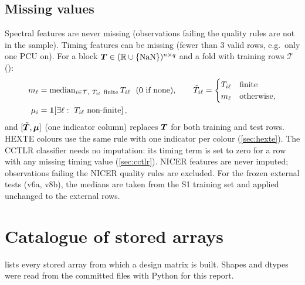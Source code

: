 \subsection{Missing values}\label{sec:missing}
Spectral features are never missing (observations failing the quality rules are not in the sample). Timing features can
be missing (fewer than 3 valid rows, e.g.\ only one PCU on). For a block $\bm{T}\in(\mathbb{R}\cup\{\mathrm{NaN}\})^{n\times q}$
and a fold with training rows $\mathcal T$ ():
\begin{equation}
\begin{split}
m_\ell &= \operatorname{median}_{i\in\mathcal T,\ T_{i\ell}\ \mathrm{finite}} T_{i\ell}\ \ (0\ \text{if none}),\qquad
\tilde T_{i\ell} = \begin{cases}T_{i\ell} & \text{finite}\\ m_\ell & \text{otherwise},\end{cases}\\
\mu_i &= \mathbf{1}\!\left[\exists \ell:\ T_{i\ell}\ \text{non-finite}\right],
\end{split}\label{eq:fillmissing}
\end{equation}
and $[\tilde{\bm{T}},\bm{\mu}]$ (one indicator column) replaces $\bm{T}$ for both training and test rows. HEXTE colours
use the same rule with one indicator per colour (\cref{sec:hexte}). The CCTLR classifier needs no imputation: its timing
term is set to zero for a row with any missing timing value (\cref{sec:cctlr}). NICER features are never imputed;
observations failing the NICER quality rules are excluded. For the frozen external tests (v6a, v8b), the medians are
taken from the S1 training set and applied unchanged to the external rows.

\section{Catalogue of stored arrays}\label{sec:dm-catalogue}

 lists every stored array from which a design matrix is built. Shapes and dtypes were read
from the committed files with Python for this report.

